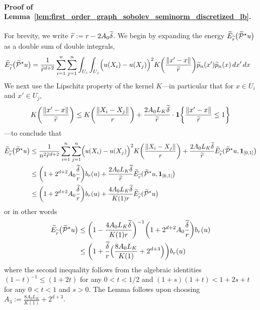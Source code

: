 \paragraph{Proof of Lemma~\ref{lem:first_order_graph_sobolev_seminorm_discretized_lb}.}
For brevity, we write $\widetilde{r} := r - 2A_0\widetilde{\delta}$. We begin by expanding the energy $\widetilde{E}_{\widetilde{r}}\bigl(\widetilde{\mathcal{P}}^{\star}u\bigr)$ as a double sum of double integrals,
\begin{align*}
\widetilde{E}_{\widetilde{r}}\bigl(\widetilde{\mathcal{P}}^{\star}u\bigr) & = \frac{1}{\widetilde{r}^{d + 2}} \sum_{i = 1}^{n} \sum_{j = 1}^{n} \int_{U_i} \int_{U_j} \Bigl(u(X_i) - u(X_j)\Bigr)^2 K\biggl(\frac{\|x' - x\|}{\widetilde{r}}\biggr) \widetilde{p}_n(x') \widetilde{p}_n(x) \,dx' \,dx
\end{align*}
We next use the Lipschitz property of the kernel $K$---in particular that for $x \in U_i$ and $x' \in U_j$,
\begin{equation*}
K\biggl(\frac{\|x' - x\|}{\widetilde{r}}\biggr) \leq K\biggl(\frac{\|X_i - X_j\|}{r}\biggr) + \frac{2A_0L_K\widetilde{\delta}}{\widetilde{r}} \cdot \mathbf{1}\biggl\{\frac{\|x' - x\|}{\widetilde{r}} \leq 1\biggr\}
\end{equation*}
---to conclude that
\begin{align}
\widetilde{E}_{\widetilde{r}}\bigl(\widetilde{\mathcal{P}}^{\star}u\bigr) & \leq \frac{1}{n^2\widetilde{r}^{d + 2}} \sum_{i = 1}^{n} \sum_{j = 1}^{n} \Bigl(u(X_i) - u(X_j)\Bigr)^2 K\biggl(\frac{\|X_i - X_j\|}{r}\biggr) + \frac{2A_0L_K\widetilde{\delta}}{\widetilde{r}}\widetilde{E}_{\widetilde{r}}(\widetilde{\mathcal{P}}^{\star}u,\mathbf{1}_{[0,1]}\bigr) \nonumber \\
& \leq \biggl(1 + 2^{d + 2}A_0\frac{\widetilde{\delta}}{r}\biggr) b_r(u) + \frac{2A_0L_K\widetilde{\delta}}{\widetilde{r}}\widetilde{E}_{\widetilde{r}}(\widetilde{\mathcal{P}}^{\star}u,\mathbf{1}_{[0,1]}\bigr) \nonumber \\
& \leq \biggl(1 + 2^{d + 2}A_0\frac{\widetilde{\delta}}{r}\biggr) b_r(u) + \frac{4A_0L_K\widetilde{\delta}}{K(1)r} \widetilde{E}_{\widetilde{r}}(\widetilde{\mathcal{P}}^{\star}u\bigr) \nonumber 
\end{align}
or in other words
\begin{align*}
\widetilde{E}_{\widetilde{r}}\bigl(\widetilde{\mathcal{P}}^{\star}u\bigr) & \leq \biggl(1 - \frac{4A_0L_K\widetilde{\delta}}{K(1)r}\biggr)^{-1}\biggl(1 + 2^{d + 2}A_0\frac{\widetilde{\delta}}{r}\biggr) b_r(u) \\
& \leq \biggl(1 + \frac{\widetilde{\delta}}{r}\Bigl(\frac{8A_0L_K}{K(1)} + 2^{d + 3}\Bigr)\biggr) b_r(u)
\end{align*}
where the second inequality follows from the algebraic identities $(1 - t)^{-1} \leq (1 + 2t)$ for any $0 < t < 1/2$ and $(1 + s)(1 + t) < 1 + 2s + t$ for any $0 < t < 1$ and $s > 0$. The Lemma follows upon choosing $A_3 := \frac{8A_0L_K}{K(1)} + 2^{d + 3}$. 

